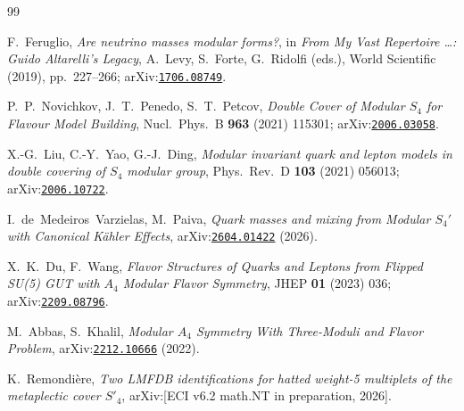 \documentclass[a4paper,11pt]{article}
\newcommand{\arXiv}[1]{\href{https://arxiv.org/abs/#1}{\texttt{#1}}}
\begin{document}
\begin{thebibliography}{99}

F.~Feruglio,
\emph{Are neutrino masses modular forms?},
in \emph{From My Vast Repertoire \ldots: Guido Altarelli's Legacy},
A.~Levy, S.~Forte, G.~Ridolfi (eds.), World Scientific (2019),
pp.~227--266; arXiv:\arXiv{1706.08749}.

P.~P.~Novichkov, J.~T.~Penedo, S.~T.~Petcov,
\emph{Double Cover of Modular $S_4$ for Flavour Model Building},
Nucl.~Phys.~B \textbf{963} (2021) 115301; arXiv:\arXiv{2006.03058}.

X.-G.~Liu, C.-Y.~Yao, G.-J.~Ding,
\emph{Modular invariant quark and lepton models in double covering of
$S_4$ modular group},
Phys.~Rev.~D \textbf{103} (2021) 056013; arXiv:\arXiv{2006.10722}.

I.~de~Medeiros~Varzielas, M.~Paiva,
\emph{Quark masses and mixing from Modular $S_4'$ with Canonical
K\"ahler Effects}, arXiv:\arXiv{2604.01422} (2026).

X.~K.~Du, F.~Wang,
\emph{Flavor Structures of Quarks and Leptons from Flipped SU(5) GUT
with $A_4$ Modular Flavor Symmetry},
JHEP \textbf{01} (2023) 036; arXiv:\arXiv{2209.08796}.

M.~Abbas, S.~Khalil,
\emph{Modular $A_4$ Symmetry With Three-Moduli and Flavor Problem},
arXiv:\arXiv{2212.10666} (2022).

K.~Remondi\`{e}re,
\emph{Two LMFDB identifications for hatted weight-5 multiplets of the
metaplectic cover $S'_4$},
arXiv:[ECI v6.2 math.NT in preparation, 2026].


\end{thebibliography}
\end{document}
